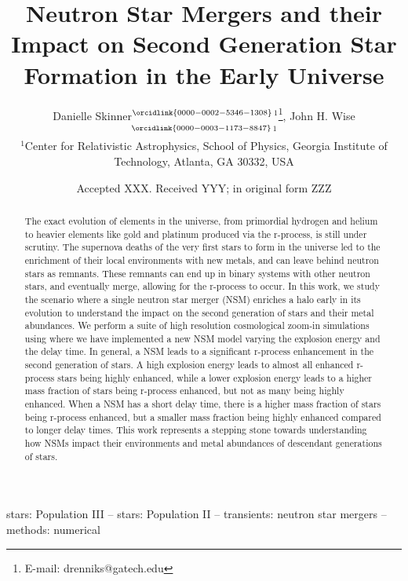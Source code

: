 \documentclass[fleqn,usenatbib]{mnras}
\title[Neutron Star Mergers from Population III Stars]{Neutron Star Mergers and their Impact on Second Generation Star Formation in the Early Universe}
\author[Skinner \& Wise]{
Danielle Skinner$^{\orcidlink{0000-0002-5346-1308}}$$^{1}$\thanks{E-mail: drenniks@gatech.edu},
John H. Wise$^{\orcidlink{0000-0003-1173-8847}}$$^{1}$
\\
$^{1}$Center for Relativistic Astrophysics, School of Physics, Georgia Institute of Technology, Atlanta, GA 30332, USA\\
}
\date{Accepted XXX. Received YYY; in original form ZZZ}
\begin{document}
\label{firstpage}
\pagerange{\pageref{firstpage}--\pageref{lastpage}}
\maketitle

\begin{abstract}
	The exact evolution of elements in the universe, from primordial hydrogen and helium to heavier elements like gold and platinum produced via the r-process, is still under scrutiny. The supernova deaths of the very first stars to form in the universe led to the enrichment of their local environments with new metals, and can leave behind neutron stars as remnants. These remnants can end up in binary systems with other neutron stars, and eventually merge, allowing for the r-process to occur. In this work, we study the scenario where a single neutron star merger (NSM) enriches a halo early in its evolution to understand the impact on the second generation of stars and their metal abundances. We perform a suite of high resolution cosmological zoom-in simulations using \enzo{} where we have implemented a new NSM model varying the explosion energy and the delay time. In general, a NSM leads to a significant r-process enhancement in the second generation of stars. A high explosion energy leads to almost all enhanced r-process stars being highly enhanced, while a lower explosion energy leads to a higher mass fraction of stars being r-process enhanced, but not as many being highly enhanced. When a NSM has a short delay time, there is a higher mass fraction of stars being r-process enhanced, but a smaller mass fraction being highly enhanced compared to longer delay times. This work represents a stepping stone towards understanding how NSMs impact their environments and metal abundances of descendant generations of stars.
\end{abstract}

\begin{keywords}
stars: Population III -- stars: Population II -- transients: neutron star mergers -- methods: numerical
\end{keywords}



\end{document}
